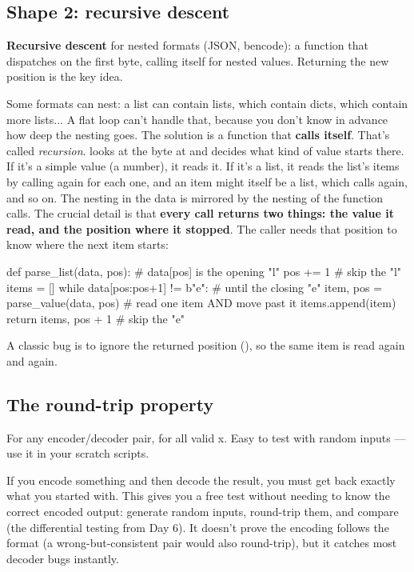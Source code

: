 \documentclass[10pt,a4paper]{article}
\begin{document}
\subsection{Shape 2: recursive descent}
\begin{keybox}
\textbf{Recursive descent} for nested formats (JSON, bencode): a function  that dispatches on the first byte, calling itself for nested values. Returning the new position is the key idea.
\end{keybox}
Some formats can nest: a list can contain lists, which contain dicts, which contain more lists... A flat loop can’t handle that, because you don’t know in advance how deep the nesting goes. The solution is a function that \textbf{calls itself}. That’s called \emph{recursion}.
 looks at the byte at  and decides what kind of value starts there. If it’s a simple value (a number), it reads it. If it’s a list, it reads the list’s items by calling  again for each one, and an item might itself be a list, which calls  again, and so on. The nesting in the data is mirrored by the nesting of the function calls.
The crucial detail is that \textbf{every call returns two things: the value it read, and the position where it stopped}. The caller needs that position to know where the next item starts:
\begin{pycode}
def parse_list(data, pos):          # data[pos] is the opening "l"
    pos += 1                        # skip the "l"
    items = []
    while data[pos:pos+1] != b"e":  # until the closing "e"
        item, pos = parse_value(data, pos)   # read one item AND move past it
        items.append(item)
    return items, pos + 1           # skip the "e"
\end{pycode}
A classic bug is to ignore the returned position (), so the same item is read again and again.
\subsection{The round-trip property}
\begin{keybox}
For any encoder/decoder pair,  for all valid x. Easy to test with random inputs — use it in your scratch scripts.
\end{keybox}
If you encode something and then decode the result, you must get back exactly what you started with. This gives you a free test without needing to know the correct encoded output: generate random inputs, round-trip them, and compare (the differential testing from Day 6). It doesn’t prove the encoding follows the format (a wrong-but-consistent pair would also round-trip), but it catches most decoder bugs instantly.
\setcounter{section}{2}
\end{document}
